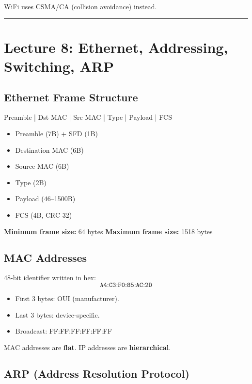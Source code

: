 \documentclass[11pt]{article}
\begin{document}
WiFi uses CSMA/CA (collision avoidance) instead.

\vspace{0.5cm}
\hrule
\vspace{0.5cm}

\section{Lecture 8: Ethernet, Addressing, Switching, ARP}

\subsection{Ethernet Frame Structure}

\begin{center}
Preamble | Dst MAC | Src MAC | Type | Payload | FCS
\end{center}

\begin{itemize}
    \item Preamble (7B) + SFD (1B)
    \item Destination MAC (6B)
    \item Source MAC (6B)
    \item Type (2B)
    \item Payload (46--1500B)
    \item FCS (4B, CRC-32)
\end{itemize}

\textbf{Minimum frame size:} 64 bytes  
\textbf{Maximum frame size:} 1518 bytes

\subsection{MAC Addresses}

48-bit identifier written in hex:
\[
\texttt{A4:C3:F0:85:AC:2D}
\]

\begin{itemize}
    \item First 3 bytes: OUI (manufacturer).
    \item Last 3 bytes: device-specific.
    \item Broadcast: FF:FF:FF:FF:FF:FF
\end{itemize}

MAC addresses are \textbf{flat}.  
IP addresses are \textbf{hierarchical}.

\subsection{ARP (Address Resolution Protocol)}
\end{document}
